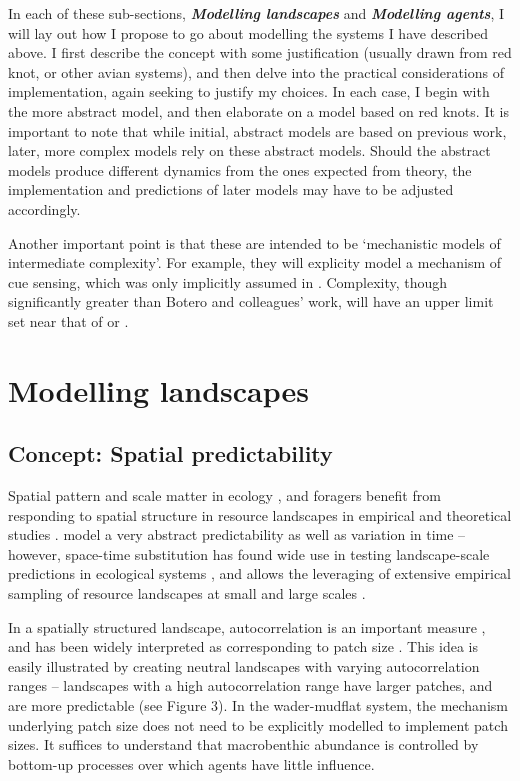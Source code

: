 In each of these sub-sections, \textbf{\emph{Modelling landscapes}} and
\textbf{\emph{Modelling agents}}, I will lay out how I propose to go
about modelling the systems I have described above. I first describe the
concept with some justification (usually drawn from red knot, or other
avian systems), and then delve into the practical considerations of
implementation, again seeking to justify my choices. In each case, I
begin with the more abstract model, and then elaborate on a model based
on red knots. It is important to note that while initial, abstract
models are based on previous work, later, more complex models rely on
these abstract models. Should the abstract models produce different
dynamics from the ones expected from theory, the implementation and
predictions of later models may have to be adjusted accordingly.

Another important point is that these are intended to be `mechanistic
models of intermediate complexity'. For example, they will explicity
model a mechanism of cue sensing, which was only implicitly assumed in
\citet{botero2015}. Complexity, though significantly greater than Botero
and colleagues' work, will have an upper limit set near that of
\citet{netz2017} or \citet{vandenberg2015a}.

\section{Modelling landscapes}

\subsection{Concept: Spatial predictability}

Spatial pattern and scale matter in ecology \citep{levin1992}, and
foragers benefit from responding to spatial structure in resource
landscapes in empirical and theoretical studies
\citep{benhamou1992, walsh1996, klaassen2006, vangils2006, vangils2010, oudman2018, bijleveld2016}.
\citet{botero2015} model a very abstract predictability as well as
variation in time -- however, space-time substitution \citet{blois2013}
has found wide use in testing landscape-scale predictions in ecological
systems \citep[e.g.][]{hirota2011, staver2011}, and allows the
leveraging of extensive empirical sampling of resource landscapes at
small \citep[e.g.][]{bijleveld2012} and large scales
\citep[e.g.][]{huete2002}.

In a spatially structured landscape, autocorrelation is an important
measure \citep{legendre1993}, and has been widely interpreted as
corresponding to patch size
\citep{kraan2009, kraan2009a, vangils2010, bijleveld2016, oudman2018}.
This idea is easily illustrated by creating neutral landscapes with
varying autocorrelation ranges -- landscapes with a high autocorrelation
range have larger patches, and are more predictable (see Figure 3). In
the wader-mudflat system, the mechanism underlying patch size does not
need to be explicitly modelled to implement patch sizes. It suffices to
understand that macrobenthic abundance is controlled by bottom-up
processes over which agents have little influence.

